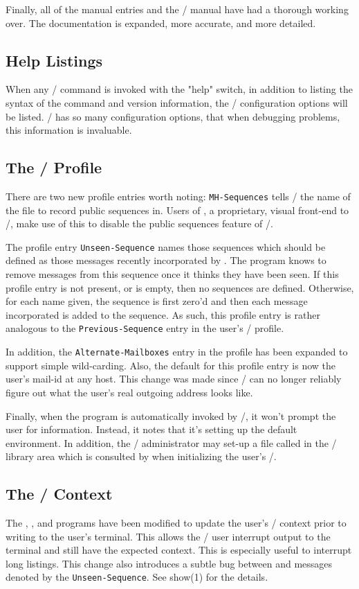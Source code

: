 Finally, all of the manual entries and the \MH/ manual have had a thorough
working over.
The documentation is expanded, more accurate, and more detailed.

\subsection*	{Help Listings}
When any \MH/ command is invoked with the \switch"help" switch,
in addition to listing the syntax of the command and version information,
the \MH/ configuration options will be listed.
\MH/ has so many configuration options,
that when debugging problems, this information is invaluable.

\subsection*	{The \MH/ Profile}
There are two new profile entries worth noting:
\verb"MH-Sequences" tells \MH/ the name of the file to record public
sequences in.
Users of , a proprietary, visual front-end to \MH/,
make use of this to disable the public sequences feature of \MH/.

The profile entry \verb"Unseen-Sequence" names those sequences which should be
defined as those messages recently incorporated by .
The  program knows to remove messages from this sequence once it
thinks they have been seen.
If this profile entry is not present, or is empty, then no sequences are
defined.
Otherwise, for each name given, the sequence is first zero'd and then each
message incorporated is added to the sequence.
As such, this profile entry is rather analogous to the
\verb"Previous-Sequence" entry in the user's \MH/ profile.

In addition, the \verb"Alternate-Mailboxes" entry in the profile has been
expanded to support simple wild-carding.
Also, the default for this profile entry is now the user's mail-id at any host.
This change was made since \MH/ can no longer reliably figure out what
the user's real outgoing address looks like.

Finally,
when the  program is automatically invoked by \MH/,
it won't prompt the user for information.
Instead, it notes that it's setting up the default environment.
In addition,
the \MH/ administrator may set-up a file called  in the \MH/
library area which is consulted by  when initializing the
user's \profile/.

\subsection*	{The \MH/ Context}
The , , and  programs have been modified to
update the user's \MH/ context prior to writing to the user's terminal.
This allows the \MH/ user interrupt output to the terminal and still have the
expected context.
This is especially useful to interrupt long  listings.
This change also introduces a subtle bug between  and messages
denoted by the \verb"Unseen-Sequence".
See \man show(1) for the details.

